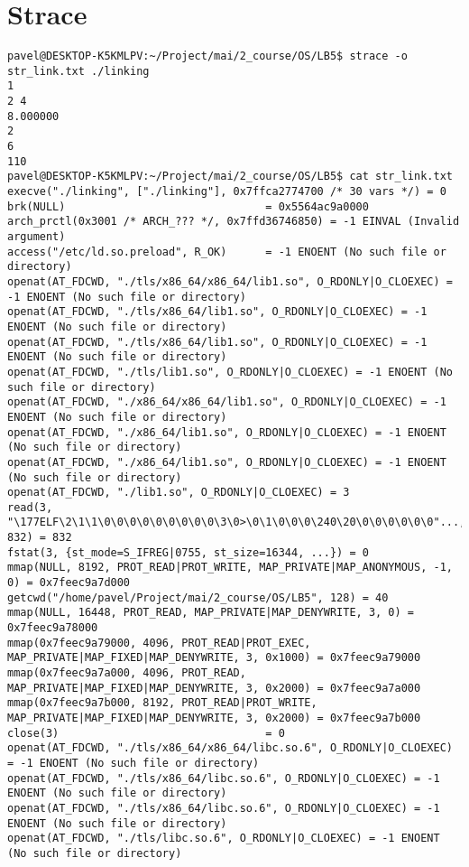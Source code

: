 \documentclass[pdf, unicode, 12pt, a4paper,oneside,fleqn]{article}
\begin{document}
\section{Strace}

{\scriptsize 
\begin{verbatim}
pavel@DESKTOP-K5KMLPV:~/Project/mai/2_course/OS/LB5$ strace -o str_link.txt ./linking
1
2 4
8.000000
2
6
110
pavel@DESKTOP-K5KMLPV:~/Project/mai/2_course/OS/LB5$ cat str_link.txt
execve("./linking", ["./linking"], 0x7ffca2774700 /* 30 vars */) = 0
brk(NULL)                               = 0x5564ac9a0000
arch_prctl(0x3001 /* ARCH_??? */, 0x7ffd36746850) = -1 EINVAL (Invalid argument)
access("/etc/ld.so.preload", R_OK)      = -1 ENOENT (No such file or directory)
openat(AT_FDCWD, "./tls/x86_64/x86_64/lib1.so", O_RDONLY|O_CLOEXEC) = -1 ENOENT (No such file or directory)
openat(AT_FDCWD, "./tls/x86_64/lib1.so", O_RDONLY|O_CLOEXEC) = -1 ENOENT (No such file or directory)
openat(AT_FDCWD, "./tls/x86_64/lib1.so", O_RDONLY|O_CLOEXEC) = -1 ENOENT (No such file or directory)
openat(AT_FDCWD, "./tls/lib1.so", O_RDONLY|O_CLOEXEC) = -1 ENOENT (No such file or directory)
openat(AT_FDCWD, "./x86_64/x86_64/lib1.so", O_RDONLY|O_CLOEXEC) = -1 ENOENT (No such file or directory)
openat(AT_FDCWD, "./x86_64/lib1.so", O_RDONLY|O_CLOEXEC) = -1 ENOENT (No such file or directory)
openat(AT_FDCWD, "./x86_64/lib1.so", O_RDONLY|O_CLOEXEC) = -1 ENOENT (No such file or directory)
openat(AT_FDCWD, "./lib1.so", O_RDONLY|O_CLOEXEC) = 3
read(3, "\177ELF\2\1\1\0\0\0\0\0\0\0\0\0\3\0>\0\1\0\0\0\240\20\0\0\0\0\0\0"..., 832) = 832
fstat(3, {st_mode=S_IFREG|0755, st_size=16344, ...}) = 0
mmap(NULL, 8192, PROT_READ|PROT_WRITE, MAP_PRIVATE|MAP_ANONYMOUS, -1, 0) = 0x7feec9a7d000
getcwd("/home/pavel/Project/mai/2_course/OS/LB5", 128) = 40
mmap(NULL, 16448, PROT_READ, MAP_PRIVATE|MAP_DENYWRITE, 3, 0) = 0x7feec9a78000
mmap(0x7feec9a79000, 4096, PROT_READ|PROT_EXEC, MAP_PRIVATE|MAP_FIXED|MAP_DENYWRITE, 3, 0x1000) = 0x7feec9a79000
mmap(0x7feec9a7a000, 4096, PROT_READ, MAP_PRIVATE|MAP_FIXED|MAP_DENYWRITE, 3, 0x2000) = 0x7feec9a7a000
mmap(0x7feec9a7b000, 8192, PROT_READ|PROT_WRITE, MAP_PRIVATE|MAP_FIXED|MAP_DENYWRITE, 3, 0x2000) = 0x7feec9a7b000
close(3)                                = 0
openat(AT_FDCWD, "./tls/x86_64/x86_64/libc.so.6", O_RDONLY|O_CLOEXEC) = -1 ENOENT (No such file or directory)
openat(AT_FDCWD, "./tls/x86_64/libc.so.6", O_RDONLY|O_CLOEXEC) = -1 ENOENT (No such file or directory)
openat(AT_FDCWD, "./tls/x86_64/libc.so.6", O_RDONLY|O_CLOEXEC) = -1 ENOENT (No such file or directory)
openat(AT_FDCWD, "./tls/libc.so.6", O_RDONLY|O_CLOEXEC) = -1 ENOENT (No such file or directory)

\end{verbatim}}
\end{document}
